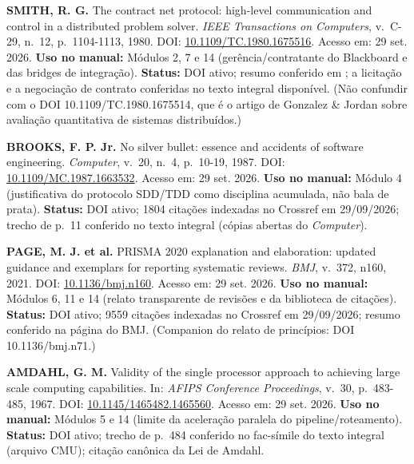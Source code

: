 \begin{referencia}
\textbf{SMITH, R. G.} The contract net protocol: high-level communication and
control in a distributed problem solver. \emph{IEEE Transactions on Computers},
v.~C-29, n.~12, p.~1104-1113, 1980. DOI:
\href{https://doi.org/10.1109/TC.1980.1675516}{10.1109/TC.1980.1675516}. Acesso em: 29 set. 2026.
\textbf{Uso no manual:} Módulos 2, 7 e 14 (gerência/contratante do Blackboard e
das bridges de integração). \textbf{Status:} DOI ativo; resumo conferido em
; a licitação e a negociação de contrato conferidas no
texto integral disponível. (Não confundir com o DOI
10.1109/TC.1980.1675514, que é o artigo de Gonzalez \& Jordan sobre avaliação
quantitativa de sistemas distribuídos.)
\end{referencia}

\begin{referencia}
\textbf{BROOKS, F. P. Jr.} No silver bullet: essence and accidents of software
engineering. \emph{Computer}, v.~20, n.~4, p.~10-19, 1987. DOI:
\href{https://doi.org/10.1109/MC.1987.1663532}{10.1109/MC.1987.1663532}. Acesso em: 29 set. 2026.
\textbf{Uso no manual:} Módulo 4 (justificativa do protocolo SDD/TDD como
disciplina acumulada, não bala de prata). \textbf{Status:} DOI ativo; 1804
citações indexadas no Crossref em 29/09/2026; trecho de p.~11 conferido no
texto integral (cópias abertas do \emph{Computer}).
\end{referencia}

\begin{referencia}
\textbf{PAGE, M. J. et al.} PRISMA 2020 explanation and elaboration: updated
guidance and exemplars for reporting systematic reviews. \emph{BMJ}, v.~372,
n160, 2021. DOI:
\href{https://doi.org/10.1136/bmj.n160}{10.1136/bmj.n160}. Acesso em: 29 set. 2026.
\textbf{Uso no manual:} Módulos 6, 11 e 14 (relato transparente de revisões e
da biblioteca de citações). \textbf{Status:} DOI ativo; 9559 citações
indexadas no Crossref em 29/09/2026; resumo conferido na página do BMJ.
(Companion do relato de princípios: DOI 10.1136/bmj.n71.)
\end{referencia}

\begin{referencia}
\textbf{AMDAHL, G. M.} Validity of the single processor approach to achieving
large scale computing capabilities. In: \emph{AFIPS Conference Proceedings},
v.~30, p.~483-485, 1967. DOI:
\href{https://doi.org/10.1145/1465482.1465560}{10.1145/1465482.1465560}. Acesso em: 29 set. 2026.
\textbf{Uso no manual:} Módulos 5 e 14 (limite da aceleração paralela do
pipeline/roteamento). \textbf{Status:} DOI ativo; trecho de p.~484 conferido
no fac-símile do texto integral (arquivo CMU); citação canônica da Lei de
Amdahl.
\end{referencia}

